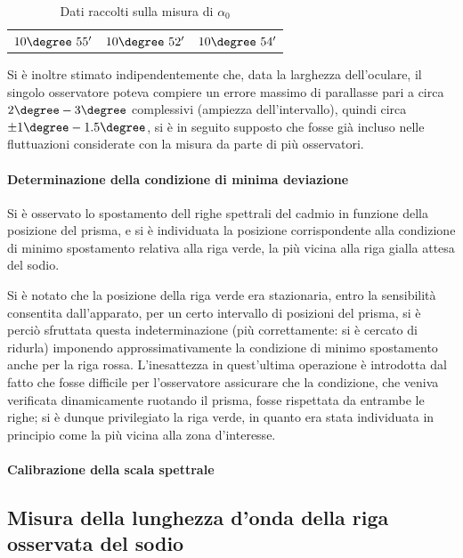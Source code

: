 \documentclass[a4paper,10pt]{article}
\begin{document}
\begin{table}[H]
	\centering
	\begin{tabular}{c|c|c}
		$10\degree~55'$  & $10\degree~52'$ & $10\degree~54'$\\
	\end{tabular}
\caption{Dati raccolti sulla misura di $\alpha_0$}
\end{table}

Si è inoltre stimato indipendentemente che, data la larghezza dell'oculare, il singolo osservatore poteva compiere un errore massimo di parallasse pari a circa $2\degree-3\degree$ complessivi (ampiezza dell'intervallo), quindi circa $\pm 1\degree-1.5\degree$, si è in seguito supposto che fosse già incluso nelle fluttuazioni considerate con la misura da parte di più osservatori.

\paragraph{Determinazione della condizione di minima deviazione} Si è osservato lo spostamento dell righe spettrali del cadmio in funzione della posizione del prisma, e si è individuata la posizione corrispondente alla condizione di minimo spostamento relativa alla riga verde, la più vicina alla riga gialla attesa del sodio.

Si è notato che la posizione della riga verde era stazionaria, entro la sensibilità consentita dall'apparato, per un certo intervallo di posizioni del prisma, si è perciò sfruttata questa indeterminazione (più correttamente: si è cercato di ridurla) imponendo approssimativamente la condizione di minimo spostamento anche per la riga rossa.
L'inesattezza in quest'ultima operazione è introdotta dal fatto che fosse difficile per l'osservatore assicurare che la condizione, che veniva verificata dinamicamente ruotando il prisma, fosse rispettata da entrambe le righe; si è dunque privilegiato la riga verde, in quanto era stata individuata in principio come la più vicina alla zona d'interesse.

\paragraph{Calibrazione della scala spettrale} 

\subsection{Misura della lunghezza d’onda della riga osservata del sodio}
\end{document}
